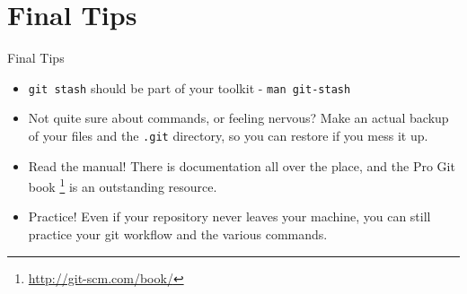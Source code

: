 \documentclass{beamer}
\begin{document}
\section{Final Tips}
\begin{frame}{Final Tips}
\begin{itemize}
  \item \texttt{git stash} should be part of your toolkit -
        \texttt{man git-stash}
  \pause
  \item Not quite sure about commands, or feeling nervous? Make an actual backup
        of your files and the \texttt{.git} directory, so you can restore if you
        mess it up.
  \pause
  \item Read the manual! There is documentation all over the place, and the Pro
        Git book
        \footnote{\href{http://git-scm.com/book/}{http://git-scm.com/book/}}
        is an outstanding resource.
  \pause
  \item Practice! Even if your repository never leaves your machine, you can
        still practice your git workflow and the various commands.
\end{itemize}


\end{frame}
\end{document}
